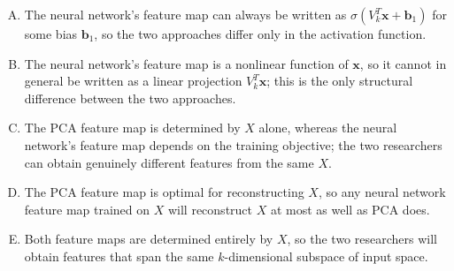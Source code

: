 \documentclass[12pt]{amsart}
\begin{document}
\begin{enumerate}[(A)]
\item The neural network's feature map can always be written as $\sigma(V_k^T \mathbf{x} + 
\mathbf{b}_1)$ for some bias $\mathbf{b}_1$, so the two approaches differ only in the 
activation function.
\item The neural network's feature map is a nonlinear function of $\mathbf{x}$, so it 
cannot in general be written as a linear projection $V_k^T \mathbf{x}$; this is the only 
structural difference between the two approaches.
\item The PCA feature map is determined by $X$ alone, whereas the neural network's feature 
map depends on the training objective; the two researchers can obtain genuinely different 
features from the same $X$.
\item The PCA feature map is optimal for reconstructing $X$, so any neural network feature 
map trained on $X$ will reconstruct $X$ at most as well as PCA does.
\item Both feature maps are determined entirely by $X$, so the two researchers will obtain 
features that span the same $k$-dimensional subspace of input space.
\end{enumerate}
%
%
%
%
\end{document}
